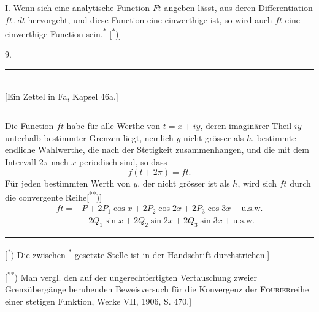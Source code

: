 \raisebox{-.4ex}{*}I. Wenn sich eine analytische Function \(Ft\) angeben lässt, aus deren Differentiation \(ft\,{.}\,dt\) hervorgeht, und diese Function eine einwerthige ist, so wird auch \(ft\) eine einwerthige Function sein.\textsuperscript{*} [\textsuperscript{*})]
\begin{center}9.\end{center}
\noindent{}\par
\begin{center}\rule{.36\linewidth}{.4pt}\\[2pt]{\small [Ein Zettel in Fa, Kapsel {\scriptsize 46}a.]}\\[-2pt]\rule{.36\linewidth}{.4pt}\end{center}
\noindent\hspace*{\parindent}Die Function \(ft\) habe für alle Werthe von \(t=x+iy\), deren imaginärer Theil \(iy\) unterhalb bestimmter Grenzen liegt, nemlich \(y\) nicht grösser als \(h\), bestimmte endliche Wahlwerthe, die nach der Stetigkeit zusammenhangen, und die mit dem Intervall \(2\pi\) nach \(x\) periodisch sind, so dass
\[f(t+2\pi)=ft.\]
\noindent Für jeden bestimmten Werth von \(y\), der nicht grösser ist als \(h\), wird sich \(ft\) durch die convergente Reihe[\textsuperscript{**})]
\[\begin{aligned}
ft={}&P+2P_1\cos x+2P_2\cos 2x+2P_3\cos 3x+\text{u.s.w.}\\
 &+2Q_1\sin x+2Q_2\sin 2x+2Q_3\sin 3x+\text{u.s.w.}
\end{aligned}\]
\par\vfill\noindent\rule{.25\linewidth}{.4pt}\par\smallskip
{\footnotesize
\noindent\hspace*{\parindent}[\textsuperscript{*}) Die zwischen \raisebox{-.4ex}{*} \textsuperscript{*} gesetzte Stelle ist in der Handschrift durchstrichen.]\par
\noindent\hspace*{\parindent}[\textsuperscript{**}) Man vergl. den auf der ungerechtfertigten Vertauschung zweier Grenzübergänge beruhenden Beweisversuch für die Konvergenz der \textsc{Fourier}reihe einer stetigen Funktion, Werke VII, {\scriptsize 1906}, S. {\scriptsize 470}.]\par}
\clearpage{}

